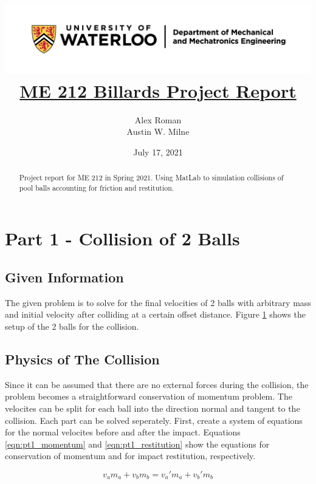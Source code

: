 \documentclass[12pt]{article}
\title{
    \includegraphics[width=\linewidth]{resources/uwaterloo_mechanical_and_mechatronics_engineering/UWaterloo_Mechanical_and_Mechatronics_Engineering/PNG/UWaterloo_Mechanical_Mechatronics_Eng_Logo_horiz_rgb.png}
    \\[1cm]
    \underline{\bf{ME 212 Billards Project Report}}
}
\author{
    Alex Roman\\
    Austin W. Milne
}
\date{July 17, 2021}
\begin{document}
\maketitle
\vfill
\begin{abstract}
    Project report for ME 212 in Spring 2021. Using MatLab to simulation collisions of pool balls accounting for friction and restitution.
\end{abstract}
\newpage

\tableofcontents
\listoftables
\listoffigures
\lstlistoflistings

\newpage


\section{Part 1 - Collision of 2 Balls}
\subsection{Given Information}
The given problem is to solve for the final velocities of 2 balls with arbitrary mass and initial velocity after colliding at a certain offset distance. Figure \ref{P1_diag} shows the setup of the 2 balls for the collision.

\begin{figure}[H]
    \centering
    
    \label{P1_diag}
\end{figure}

\subsection{Physics of The Collision}

Since it can be assumed that there are no external forces during the collision, the problem becomes a straightforward conservation of momentum problem. The velocites can be split for each ball into the direction normal and tangent to the collision. Each part can be solved seperately. First, create a system of equations for the normal velocites before and after the impact. Equations \ref{eqn:pt1_momentum} and \ref{eqn:pt1_restitution} show the equations for conservation of momentum and for impact restitution, respectively.

\begin{equation}
    \label{eqn:pt1_momentum}
    v_a m_a + v_b m_b = v_a' m_a + v_b' m_b
\end{equation}
\end{document}
